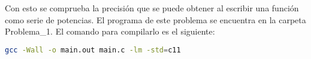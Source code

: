 Con esto se comprueba la precisión que se puede obtener al escribir una función como serie de potencias.
El programa de este problema se encuentra en la carpeta \textcolor{citecolor}{Problema\_1}. El comando para compilarlo es el siguiente:

\begin{lstlisting}[language=bash]
    gcc -Wall -o main.out main.c -lm -std=c11
\end{lstlisting}
